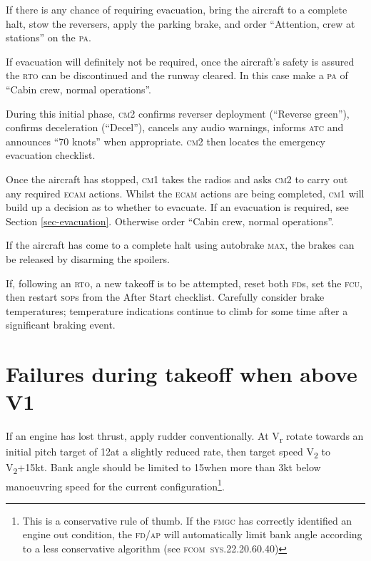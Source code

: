 \documentclass[a5paper,11pt,twoside]{book}
\newcommand{\ac}[1]{{\scshape\MakeLowercase{#1}}}
\newcommand{\cphrase}[1]{\ac{#1}}
\newcommand{\inlcite}[1]{{\ac{#1}}}
\newcommand{\multicite}[1]{%
  \nopagebreak
  \noindent{{\color{blue}\footnotesize[\inlcite{#1}]}}
}
\newcommand{\V}[1]{V\textsubscript{#1}}
\begin{document}
If there is any chance of requiring evacuation, bring the aircraft to a complete
halt, stow the reversers, apply the parking brake, and order ``Attention, crew
at stations'' on the \ac{PA}.

If evacuation will definitely not be required, once the aircraft's safety is
assured the \ac{RTO} can be discontinued and the runway cleared. In this case
make a \ac{PA} of ``Cabin crew, normal operations''.

During this initial phase, \ac{CM2} confirms reverser deployment (``Reverse
green''), confirms deceleration (``Decel''), cancels any audio warnings, informs
\ac{ATC} and announces ``70 knots'' when appropriate. \ac{CM2} then locates the
emergency evacuation checklist.

Once the aircraft has stopped, \ac{CM1} takes the radios and asks \ac{CM2} to
carry out any required \ac{ECAM} actions. Whilst the \ac{ECAM} actions are being
completed, \ac{CM1} will build up a decision as to whether to evacuate. If an
evacuation is required, see Section \ref{sec-evacuation}. Otherwise order
``Cabin crew, normal operations''.

If the aircraft has come to a complete halt using autobrake \cphrase{MAX}, the brakes
can be released by disarming the spoilers.

If, following an \ac{RTO}, a new takeoff is to be attempted, reset both
\ac{FD}s, set the \ac{FCU}, then restart \ac{SOP}s from the After Start
checklist. Carefully consider brake temperatures; temperature indications
continue to climb for some time after a significant braking event.

\multicite{EOMB~3.10, FCTM~PRO.AEP.MISC}


\section{Failures during takeoff when above V1}
\label{sec-failures-after-v1}

If an engine has lost thrust, apply rudder conventionally. At V\textsubscript{r}
rotate towards an initial pitch target of 12\textonehalf\textdegree{ }at a
slightly reduced rate, then target speed \V{2} to \V{2}+15kt. Bank angle should
be limited to 15\textdegree{ }when more than 3kt below manoeuvring speed for the
current configuration\footnote{This is a conservative rule of thumb. If the
\ac{FMGC} has correctly identified an engine out condition, the \ac{FD/AP} will
automatically limit bank angle according to a less conservative
algorithm (see \inlcite{FCOM~SYS.22.20.60.40})}.
\end{document}
